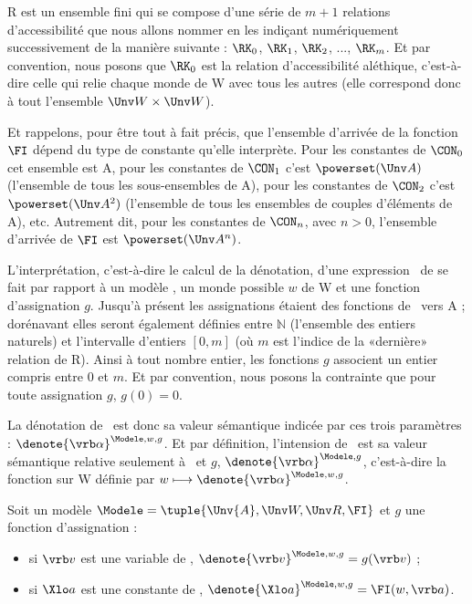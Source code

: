 \Unv R est un ensemble fini qui se compose d'une série de $m+1$ relations d'accessibilité que nous allons nommer en les indiçant numériquement successivement de la manière suivante :  $\RK_0$, $\RK_1$, $\RK_2$, ..., $\RK_m$.  
Et par convention, nous posons que $\RK_0$ est la relation d'accessibilité aléthique, c'est-à-dire celle qui relie chaque monde de \Unv W avec tous les autres (elle correspond donc à tout l'ensemble $\Unv W\times\Unv W$).

Et rappelons, pour être tout à fait précis, que l'ensemble d'arrivée de la fonction $\FI$ dépend du type de constante qu'elle interprète. Pour les constantes de $\CON_0$ cet ensemble est \Unv A, pour les constantes de $\CON_1$  c'est $\powerset(\Unv A)$ (l'ensemble de tous les sous-ensembles de \Unv A), pour les constantes de $\CON_2$ c'est $\powerset(\Unv A^2)$ (l'ensemble de tous les ensembles de couples d'éléments de \Unv A), etc. 
Autrement dit, pour les constantes de $\CON_n$, avec $n>0$, l'ensemble d'arrivée de $\FI$ est $\powerset(\Unv A^n)$.


L'interprétation, c'est-à-dire le calcul de la dénotation, d'une expression \vrb\alpha\ de {\LO} se fait par rapport à un modèle \Modele, un monde possible $w$ de \Unv W et une fonction d'assignation $g$. Jusqu'à présent les assignations étaient des fonctions de \VAR\ vers \Unv A ; dorénavant elles seront également définies entre $\mathbb{N}$ (l'ensemble des entiers naturels) et l'intervalle d'entiers $[0,m]$ (où $m$ est l'indice de la  «dernière» relation de \Unv R). Ainsi à tout nombre entier, les fonctions $g$ associent un entier compris entre $0$ et $m$. Et par convention, nous posons la contrainte que pour toute assignation $g$, $g(0)=0$.

\largerpage[-1]

La dénotation de \vrb\alpha\ est donc sa valeur sémantique indicée par ces trois paramètres : $\denote{\vrb\alpha}^{\Modele,w,g}$.  Et par définition, l'intension de \vrb\alpha\ est sa valeur sémantique relative seulement à \Modele\ et $g$, \(\denote{\vrb\alpha}^{\Modele,g}\), c'est-à-dire la fonction sur \Unv W définie par $w\longmapsto \denote{\vrb\alpha}^{\Modele,w,g}$.

\begin{defi}
  Soit un modèle \(\Modele = \tuple{\Unv{A},\Unv W,\Unv R,\FI}\) et $g$ une fonction
  d'assignation : 
\begin{itemize}
\item si $\vrb v$ est une variable de \VAR, \(\denote{\vrb v}^{\Modele,w,g}=g(\vrb v)\) ;
\item si $\Xlo a$ est une constante de \CON, \(\denote{\Xlo a}^{\Modele,w,g}=\FI(w,\vrb a)\).
\end{itemize}
\end{defi}

